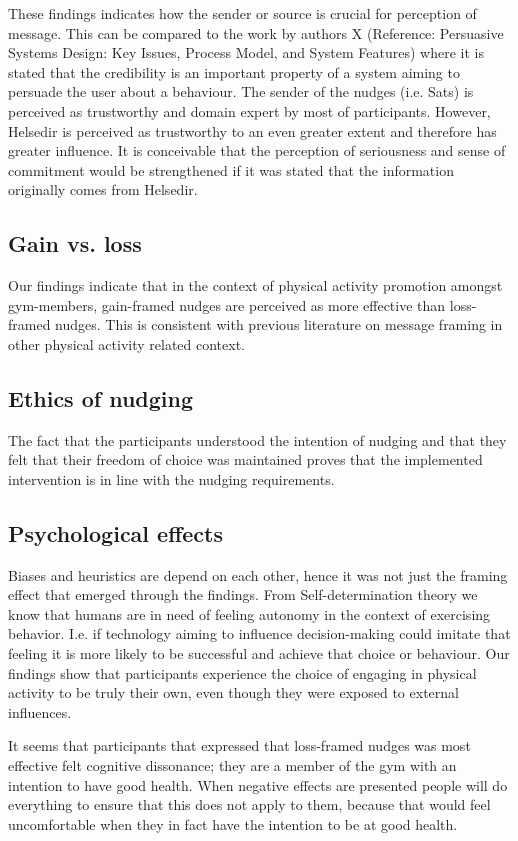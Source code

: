 These findings indicates how the sender or source is crucial for perception of message. This can be compared to the work by authors X (Reference: Persuasive Systems Design: Key Issues, Process Model, and System Features) where it is stated that the credibility is an important property of a system aiming to persuade the user about a behaviour. The sender of the nudges (i.e. Sats) is perceived as trustworthy and domain expert by most of participants. However, Helsedir is perceived as trustworthy to an even greater extent and therefore has greater influence. It is conceivable that the perception of seriousness and sense of commitment would be strengthened if it was stated that the information originally comes from Helsedir. 

\subsection{Gain vs. loss}
Our findings indicate that in the context of physical activity promotion amongst gym-members, gain-framed nudges are perceived as more effective than loss-framed nudges. This is consistent with previous literature on message framing in other physical activity related context. 

\subsection{Ethics of nudging}
The fact that the participants understood the intention of nudging and that they felt that their freedom of choice was maintained proves that the implemented intervention is in line with the nudging requirements.

\subsection{Psychological effects}
Biases and heuristics are depend on each other, hence it was not just the framing effect that emerged through the findings. From Self-determination theory we know that humans are in need of feeling autonomy in the context of exercising behavior. I.e. if technology aiming to influence decision-making could imitate that feeling it is more likely to be successful and achieve that choice or behaviour. Our findings show that participants experience the choice of engaging in physical activity to be truly their own, even though they were exposed to external influences. 

It seems that participants that expressed that loss-framed nudges was most effective felt cognitive dissonance; they are a member of the gym with an intention to have good health. When negative effects are presented people will do everything to ensure that this does not apply to them, because that would feel uncomfortable when they in fact have the intention to be at good health. 

